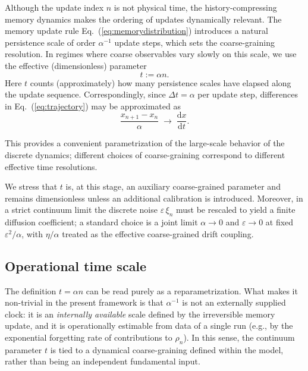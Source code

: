 \documentclass[reprint,amsmath,amssymb,aps,prd,nofootinbib,floatfix]{revtex4-2}
\begin{document}
Although the update index $n$ is not physical time, the history-compressing memory dynamics makes the ordering of updates dynamically relevant.
The memory update rule Eq.~(\ref{eq:memorydistribution}) introduces a natural persistence scale of order $\alpha^{-1}$ update steps, which sets the coarse-graining resolution.
In regimes where coarse observables vary slowly on this scale, we use the effective (dimensionless) parameter
\begin{equation}\label{eq:t_taup}
t := \alpha n.
\end{equation}
Here $t$ counts (approximately) how many persistence scales have elapsed along the update sequence.
Correspondingly, since $\Delta t = \alpha$ per update step, differences in Eq.~(\ref{eq:trajectory}) may be approximated as
\begin{equation}
\frac{x_{n+1} - x_n}{\alpha}
\;\longrightarrow\;
\frac{\mathrm{d}x}{\mathrm{d}t}.
\end{equation}

This provides a convenient parametrization of the large-scale behavior of the discrete dynamics; different choices of coarse-graining correspond to different effective time resolutions.

We stress that $t$ is, at this stage, an auxiliary coarse-grained parameter and remains dimensionless unless an additional calibration is introduced.
Moreover, in a strict continuum limit the discrete noise $\varepsilon\,\xi_n$ must be rescaled to yield a finite diffusion coefficient; a standard choice is a joint limit $\alpha\to 0$ and $\varepsilon\to 0$ at fixed $\varepsilon^2/\alpha$, with $\eta/\alpha$ treated as the effective coarse-grained drift coupling.

\subsection{Operational time scale}

The definition $t=\alpha n$ can be read purely as a reparametrization.
What makes it non-trivial in the present framework is that $\alpha^{-1}$ is not an externally supplied clock: it is an \emph{internally available} scale defined by the irreversible memory update, and it is operationally estimable from data of a single run (e.g., by the exponential forgetting rate of contributions to $\rho_n$).
In this sense, the continuum parameter $t$ is tied to a dynamical coarse-graining defined within the model, rather than being an independent fundamental input.
\end{document}
